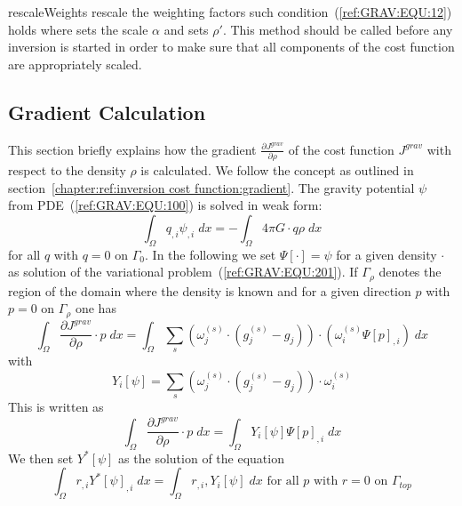 \begin{methoddesc}[GravityModel]{rescaleWeights}{
 }
rescale the weighting factors such condition~(\ref{ref:GRAV:EQU:12}) holds where 
 sets the scale $\alpha$
and  sets $\rho'$. This method should be called before any inversion is started
in order to make sure that all components of the cost function are appropriately scaled.
\end{methoddesc}


\subsection{Gradient Calculation}
This section briefly explains how the gradient
$\frac{\partial J^{grav}}{\partial \rho}$ of the cost function $J^{grav}$ with
respect to the density $\rho$ is calculated. We follow the concept as outlined in section~\ref{chapter:ref:inversion cost function:gradient}.
The gravity potential $\psi$ from PDE~(\ref{ref:GRAV:EQU:100}) is solved in
weak form:
\begin{equation}\label{ref:GRAV:EQU:201}
\int_{\Omega} q_{,i} \psi_{,i} \; dx  = - \int_{\Omega}  4\pi G \cdot q \rho\; dx 
\end{equation} 
for all $q$ with $q=0$ on $\Gamma_0$.
In the following we set $\Psi[\cdot]=\psi$ for a given density $\cdot$ as
solution of the variational problem~(\ref{ref:GRAV:EQU:201}).
If $\Gamma_{\rho}$ denotes the region of the domain where the density is known
and for a given direction $p$ with $p=0$ on $\Gamma_{\rho}$ one has
\begin{equation}\label{ref:GRAV:EQU:201aa}
\int_{\Omega}   \frac{\partial J^{grav}}{\partial \rho} \cdot p \; dx  =  \int_{\Omega}  
\sum_{s} (\omega^{(s)}_j \cdot 
(g^{(s)}_j-g_{j}) ) \cdot ( \omega^{(s)}_i \Psi[p]_{,i})  \; dx  
\end{equation} 
with 
\begin{equation}\label{ref:GRAV:EQU:202c}
Y_i[\psi]=  \sum_{s} (\omega^{(s)}_j \cdot 
(g^{(s)}_j-g_{j}) ) \cdot  \omega^{(s)}_i
\end{equation} 
This is written as 
\begin{equation}\label{ref:GRAV:EQU:202cc}
\int_{\Omega}   \frac{\partial J^{grav}}{\partial \rho} \cdot p \;  dx  = \int_{\Omega}  
Y_i[\psi] \Psi[p]_{,i} \; dx  
\end{equation} 
We then set $Y^*[\psi]$ as the solution of the equation 
\begin{equation}\label{ref:GRAV:EQU:202d}
\int_{\Omega} r_{,i} Y^*[\psi]_{,i} \; dx  =  \int_{\Omega} r_{,i} ,Y_i[\psi]  \; dx  \mbox{ for all } p \mbox{ with } r=0 \mbox{ on } \Gamma_{top}
\end{equation} 
